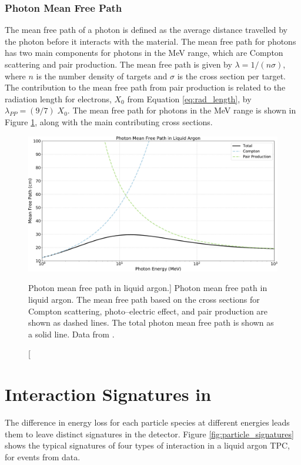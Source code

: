 \subsubsection*{Photon Mean Free Path}
The mean free path of a photon is defined as the average distance travelled by 
the photon before it interacts with the material. The mean free path for 
photons has two main components for photons in the MeV range, which are 
Compton scattering and pair production. The mean free path is given by 
$\lambda = 1 / (n \sigma)$, where $n$ is the number density of targets and 
$\sigma$ is the cross section per target. The contribution to the mean free 
path from pair production is related to the radiation length for electrons, 
$X_0$ from Equation \ref{eq:rad_length}, by $\lambda_{PP} = (9/7) \; 
X_0$\cite{PhysRevD.98.030001}. The mean free path for photons in the MeV 
range is shown in Figure \ref{fig:photon_mfp}, along with the main 
contributing cross sections. 

\begin{figure}

	\centering

	\includegraphics[width=\textwidth]{figures/photon_mfp.pdf}

	\caption
	[Photon mean free path in liquid argon.]
	{Photon mean free path in liquid argon. The mean free path based on the cross
	sections for Compton scattering, photo--electric effect, and pair production 
	are shown as dashed lines. The total photon mean free path is shown as a 
	solid line. Data from \cite{photon_xsection}.}

	\label{fig:photon_mfp}

\end{figure}

\section{Interaction Signatures in \protodune{}}
The difference in energy loss for each particle species at different energies 
leads them to leave distinct signatures in the detector. Figure 
\ref{fig:particle_signatures} shows the typical signatures of four types of 
interaction in a liquid argon TPC, for events from \protodune{} data.

